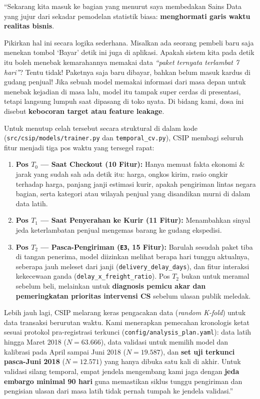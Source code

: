 \documentclass[11pt,a4paper,oneside]{book}
\newcommand{\code}[1]{{\small\nolinkurl{#1}}}
\begin{document}
\begin{scriptbox}
``Sekarang kita masuk ke bagian yang menurut saya membedakan Sains Data yang jujur dari sekadar pemodelan statistik biasa: \textbf{menghormati garis waktu realitas bisnis}.

Pikirkan hal ini secara logika sederhana. Misalkan ada seorang pembeli baru saja menekan tombol `Bayar' detik ini juga di aplikasi. Apakah sistem kita pada detik itu boleh menebak kemarahannya memakai data \emph{``paket ternyata terlambat 7 hari''}? Tentu tidak! Paketnya saja baru dibayar, bahkan belum masuk kardus di gudang penjual! Jika sebuah model memakai informasi dari masa depan untuk menebak kejadian di masa lalu, model itu tampak super cerdas di presentasi, tetapi langsung lumpuh saat dipasang di toko nyata. Di bidang kami, dosa ini disebut \textbf{kebocoran target atau feature leakage}.

Untuk menutup celah tersebut secara struktural di dalam kode (\code{src/csip/models/trainer.py} dan \code{temporal_cv.py}), CSIP membagi seluruh fitur menjadi tiga pos waktu yang tersegel rapat:
\begin{enumerate}
  \item \textbf{Pos $T_0$ --- Saat Checkout (10 Fitur):} Hanya memuat fakta ekonomi \& jarak yang sudah sah ada detik itu: harga, ongkos kirim, rasio ongkir terhadap harga, panjang janji estimasi kurir, apakah pengiriman lintas negara bagian, serta kategori atau wilayah penjual yang disandikan murni di dalam data latih.
  \item \textbf{Pos $T_1$ --- Saat Penyerahan ke Kurir (11 Fitur):} Menambahkan sinyal jeda keterlambatan penjual mengemas barang ke gudang ekspedisi.
  \item \textbf{Pos $T_2$ --- Pasca-Pengiriman (\code{E3}, 15 Fitur):} Barulah sesudah paket tiba di tangan penerima, model diizinkan melihat berapa hari tunggu aktualnya, seberapa jauh meleset dari janji (\code{delivery_delay_days}), dan fitur interaksi kekecewaan ganda (\code{delay_x_freight_ratio}). Pos $T_2$ bukan untuk meramal sebelum beli, melainkan untuk \textbf{diagnosis pemicu akar dan pemeringkatan prioritas intervensi CS} sebelum ulasan publik meledak.
\end{enumerate}

Lebih jauh lagi, CSIP melarang keras pengacakan data (\emph{random K-fold}) untuk data transaksi berurutan waktu. Kami menerapkan pemecahan kronologis ketat sesuai protokol pra-registrasi terkunci (\code{config/analysis_plan.yaml}): data latih hingga Maret 2018 ($N = 63.666$), data validasi untuk memilih model dan kalibrasi pada April sampai Juni 2018 ($N = 19.587$), dan \textbf{set uji terkunci pasca-Juni 2018} ($N = 12.571$) yang hanya dibuka satu kali di akhir. Untuk validasi silang temporal, empat jendela mengembang kami jaga dengan \textbf{jeda embargo minimal 90 hari} guna memastikan siklus tunggu pengiriman dan pengisian ulasan dari masa latih tidak pernah tumpah ke jendela validasi.''
\end{scriptbox}
\end{document}
